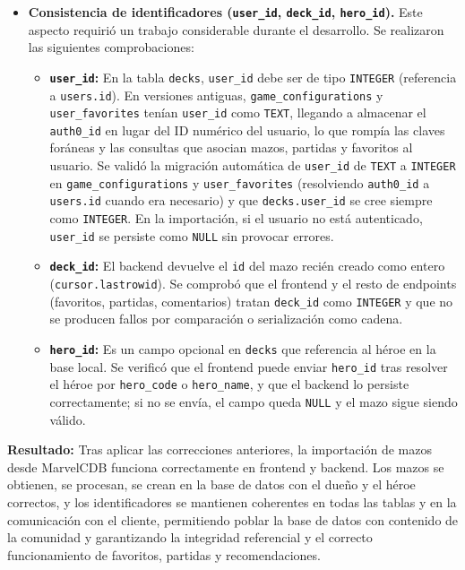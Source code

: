 \begin{itemize}
    \item \textbf{Consistencia de identificadores (\texttt{user\_id}, \texttt{deck\_id}, \texttt{hero\_id}).} Este aspecto requirió un trabajo considerable durante el desarrollo. Se realizaron las siguientes comprobaciones:
    \begin{itemize}
        \item \textbf{\texttt{user\_id}:} En la tabla \texttt{decks}, \texttt{user\_id} debe ser de tipo \texttt{INTEGER} (referencia a \texttt{users.id}). En versiones antiguas, \texttt{game\_configurations} y \texttt{user\_favorites} tenían \texttt{user\_id} como \texttt{TEXT}, llegando a almacenar el \texttt{auth0\_id} en lugar del ID numérico del usuario, lo que rompía las claves foráneas y las consultas que asocian mazos, partidas y favoritos al usuario. Se validó la migración automática de \texttt{user\_id} de \texttt{TEXT} a \texttt{INTEGER} en \texttt{game\_configurations} y \texttt{user\_favorites} (resolviendo \texttt{auth0\_id} a \texttt{users.id} cuando era necesario) y que \texttt{decks.user\_id} se cree siempre como \texttt{INTEGER}. En la importación, si el usuario no está autenticado, \texttt{user\_id} se persiste como \texttt{NULL} sin provocar errores.
        \item \textbf{\texttt{deck\_id}:} El backend devuelve el \texttt{id} del mazo recién creado como entero (\texttt{cursor.lastrowid}). Se comprobó que el frontend y el resto de endpoints (favoritos, partidas, comentarios) tratan \texttt{deck\_id} como \texttt{INTEGER} y que no se producen fallos por comparación o serialización como cadena.
        \item \textbf{\texttt{hero\_id}:} Es un campo opcional en \texttt{decks} que referencia al héroe en la base local. Se verificó que el frontend puede enviar \texttt{hero\_id} tras resolver el héroe por \texttt{hero\_code} o \texttt{hero\_name}, y que el backend lo persiste correctamente; si no se envía, el campo queda \texttt{NULL} y el mazo sigue siendo válido.
    \end{itemize}
\end{itemize}

\textbf{Resultado:} Tras aplicar las correcciones anteriores, la importación de mazos desde MarvelCDB funciona correctamente en frontend y backend. Los mazos se obtienen, se procesan, se crean en la base de datos con el dueño y el héroe correctos, y los identificadores se mantienen coherentes en todas las tablas y en la comunicación con el cliente, permitiendo poblar la base de datos con contenido de la comunidad y garantizando la integridad referencial y el correcto funcionamiento de favoritos, partidas y recomendaciones.

